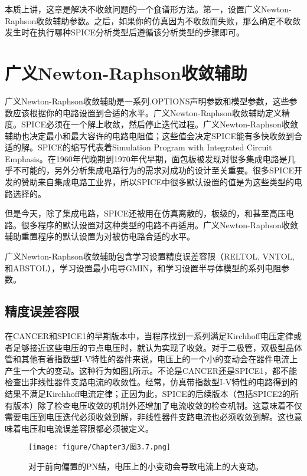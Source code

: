 本质上讲，这章是解决不收敛问题的一个食谱形方法。第一，设置广义Newton-Raphson收敛辅助参数。之后，如果你的仿真因为不收敛而失败，那么确定不收敛发生时在执行哪种SPICE分析类型后遵循该分析类型的步骤即可。

\section{广义Newton-Raphson收敛辅助}
广义Newton-Raphson收敛辅助是一系列.OPTIONS声明参数和模型参数，这些参数应该根据你的电路设置到合适的水平。广义Newton-Raphson收敛辅助定义精度。SPICE必须在一个解上收敛，然后停止迭代过程。广义Newton-Raphson收敛辅助也决定最小和最大容许的电路电阻值；这些值会决定SPICE能有多快收敛到合适的解。SPICE的缩写代表着Simulation Program with Integrated Circuit Emphasis。在1960年代晚期到1970年代早期，面包板被发现对很多集成电路是几乎不可能的，另外分析集成电路行为的需求对成功的设计至关重要。很多SPICE开发的赞助来自集成电路工业界，所以SPICE中很多默认设置的值是为这些类型的电路选择的。

但是今天，除了集成电路，SPICE还被用在仿真离散的，板级的，和甚至高压电路。很多程序的默认设置对这种类型的电路不再适用。广义Newton-Raphson收敛辅助重置程序的默认设置为对被仿电路合适的水平。

广义Newton-Raphson收敛辅助包含学习设置精度误差容限（RELTOL, VNTOL,和ABSTOL），学习设置最小电导GMIN，和学习设置半导体模型的系列电阻参数。

\subsection{精度误差容限}
在CANCER和SPICE1的早期版本中，当程序找到一系列满足Kirchhoff电压定律或者足够接近这些电压的节点电压时，就认为实现了收敛。对于二极管，双极型晶体管和其他有着指数型I-V特性的器件来说，电压上的一个小的变动会在器件电流上产生一个大的变动。这种行为如图\ref{图3.7}所示。不论是CANCER还是SPICE1，都不能检查出非线性器件支路电流的收敛性。经常，仿真带指数型I-V特性的电路得到的结果不满足Kirchhoff电流定律；正因为此，SPICE的后续版本（包括SPICE2的所有版本）除了检查电压收敛的机制外还增加了电流收敛的检查机制。这意味着不仅需要电压到电压迭代必须收敛到解，非线性器件支路电流也必须收敛到解。这也意味着电压和电流误差容限都必须被定义。

\begin{figure}[htbp]
\small
    \centering
    \texttt{[image: figure/Chapter3/图3.7.png]}
    \caption{对于前向偏置的PN结，电压上的小变动会导致电流上的大变动。}
    \label{图3.7}
\end{figure}

